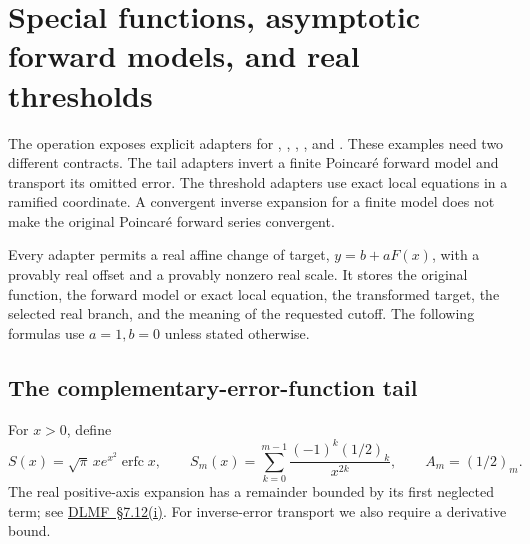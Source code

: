 \section{Special functions, asymptotic forward models, and real thresholds}
\label{sec:special-function-adapters}

The operation  exposes explicit adapters for
, , ,
, and .
These examples need two different contracts. The tail adapters invert a
finite Poincar\'e forward model and transport its omitted error. The
threshold adapters use exact local equations in a ramified coordinate.
A convergent inverse expansion for a finite model does not make the
original Poincar\'e forward series convergent.

Every adapter permits a real affine change of target,
$y=b+aF(x)$, with a provably real offset and a provably nonzero real scale.
It stores the original function, the forward model or exact local equation,
the transformed target, the selected real branch, and the meaning of the
requested cutoff. The following formulas use $a=1,b=0$ unless stated
otherwise.

\subsection{The complementary-error-function tail}

For $x>0$, define
\begin{equation}
 S(x)=\sqrt\pi\,x e^{x^2}\operatorname{erfc}x,
 \qquad
 S_m(x)=\sum_{k=0}^{m-1}\frac{(-1)^k(1/2)_k}{x^{2k}},
 \qquad A_m=(1/2)_m.
 \label{eq:erfc-normalized-tail}
\end{equation}
The real positive-axis expansion has a remainder bounded by its first
neglected term; see
\href{https://dlmf.nist.gov/7.12.i}{DLMF~\S7.12(i)}.
For inverse-error transport we also require a derivative bound.

